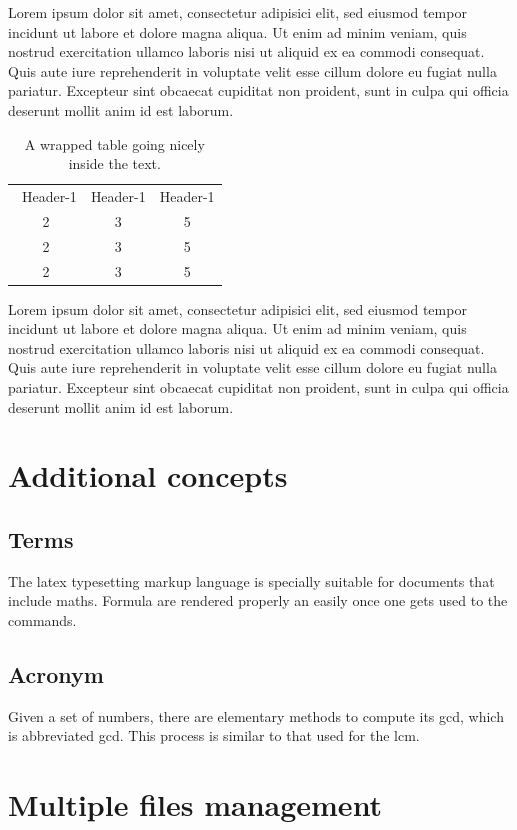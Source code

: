 \documentclass[a4paper, oneside]{book}
\begin{document}
Lorem ipsum dolor sit amet, consectetur adipisici elit, sed eiusmod tempor incidunt ut labore et dolore magna aliqua. Ut enim ad minim veniam, quis nostrud exercitation ullamco laboris nisi ut aliquid ex ea commodi consequat. Quis aute iure reprehenderit in voluptate velit esse cillum dolore eu fugiat nulla pariatur. Excepteur sint obcaecat cupiditat non proident, sunt in culpa qui officia deserunt mollit anim id est laborum.
\begin{table}
\caption{A wrapped table going nicely inside the text.}\label{wrap-tab:1}
\begin{tabular}{ccc}\  
Header-1 & Header-1 & Header-1 \\
2 &3 & 5\\  
2 &3 & 5\\  
2 &3 & 5\\  
\end{tabular}
\end{table}
Lorem ipsum dolor sit amet, consectetur adipisici elit, sed eiusmod tempor incidunt ut labore et dolore magna aliqua. Ut enim ad minim veniam, quis nostrud exercitation ullamco laboris nisi ut aliquid ex ea commodi consequat. Quis aute iure reprehenderit in voluptate velit esse cillum dolore eu fugiat nulla pariatur. Excepteur sint obcaecat cupiditat non proident, sunt in culpa qui officia deserunt mollit anim id est laborum.

\chapter{Additional concepts}

\section{Terms}

The \Gls{latex} typesetting markup language is specially suitable 
for documents that include maths. Formula are rendered 
properly an easily once one gets used to the commands.

\section{Acronym}

Given a set of numbers, there are elementary methods to compute 
its \ac{gcd}, which is abbreviated gcd. This 
process is similar to that used for the lcm.

\chapter{Multiple files management}
\end{document}
